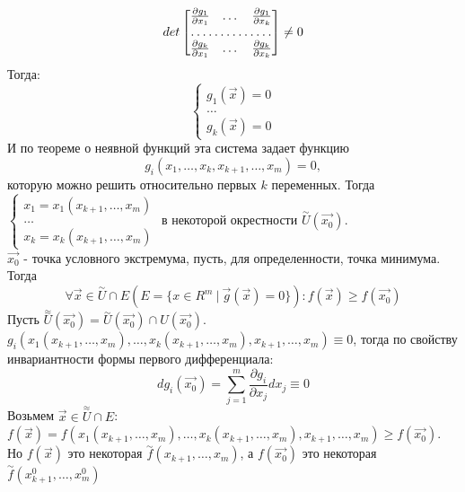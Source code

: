 \documentclass[12pt]{article}
\begin{document}
$$det \begin{bmatrix}
   \frac{\partial g_1}{\partial x_1} & \dots & \frac{\partial g_1}{\partial x_k} \\
    \hdotsfor{3} \\
    \frac{\partial g_k}{\partial x_1} & \dots & \frac{\partial g_k}{\partial x_k} \\
\end{bmatrix}\neq 0$$
Тогда:\\
$$\begin{cases} g_1(\overrightarrow{x}) = 0 \\ \dots \\ g_k(\overrightarrow{x}) = 0 \end{cases}$$
И по теореме о неявной функций эта система задает функцию\\
$$g_i (x_1,\dots,x_k,x_{k+1},\dots, x_m) = 0,$$
которую можно решить относительно первых $k$ переменных. Тогда\\
$\begin{cases} x_1 = x_1(x_{k+1}, \dots, x_m) \\ \dots \\ x_k = x_k(x_{k+1}, \dots, x_m) \end{cases}$ в некоторой окрестности $\overset{\sim}{U}(\overrightarrow{x_0})$.\\
$\overrightarrow{x_0}$ - точка условного экстремума, пусть, для определенности, точка минимума. Тогда\\
$$\forall \overrightarrow{x} \in \overset{\sim}{U} \cap E (E = \{x \in R^m \ | \ \overrightarrow{g}(\overrightarrow{x})=0 \}) : f(\overrightarrow{x}) \geq f(\overrightarrow{x_0})$$
Пусть $\overset{\approx}{U}(\overrightarrow{x_0}) = \overset{\sim}{U}(\overrightarrow{x_0}) \cap U(\overrightarrow{x_0})$.\\
$g_i(x_1(x_{k+1},\dots,x_m),\dots,x_k(x_{k+1},\dots,x_m),x_{k+1},\dots,x_m) \equiv 0$, тогда по свойству инвариантности формы первого дифференциала:\\
$$dg_i(\overrightarrow{x_0})=\sum_{j=1}^m \frac{\partial g_i}{\partial x_j} dx_j \equiv 0$$
Возьмем $\overrightarrow{x} \in \overset{\approx}{U} \cap E$:\\
$f(\overrightarrow{x}) = f(x_1(x_{k+1},\dots,x_m),\dots,x_k(x_{k+1},\dots,x_m),x_{k+1},\dots,x_m) \geq f(\overrightarrow{x_0})$.\\
Но $f(\overrightarrow{x})$ это некоторая $\overset{\sim}{f}(x_{k+1},\dots,x_m)$, а $f(\overrightarrow{x_0})$ это некоторая $\overset{\sim}{f}(x_{k+1}^0,\dots,x_m^0)$\\
\end{document}
